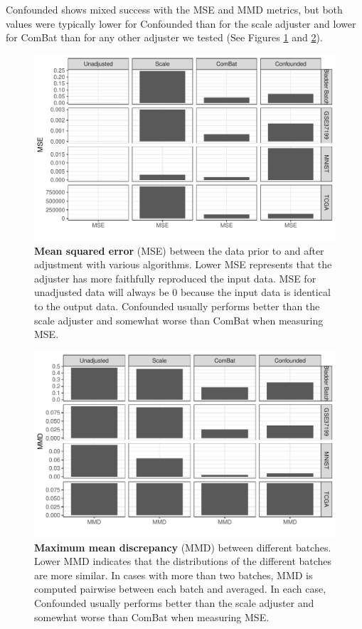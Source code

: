 \documentclass[notitlepage]{article}
\begin{document}
Confounded shows mixed success with the MSE and MMD metrics, but both values were typically lower for Confounded than for the scale adjuster and lower for ComBat than for any other adjuster we tested (See Figures \ref{fig:mse} and \ref{fig:mmd}).

\begin{figure}
	\centering
	\includegraphics[width=\columnwidth]{figures/final/mse}
	\caption{\textbf{Mean squared error} (MSE) between the data prior to and after adjustment with various algorithms.
	Lower MSE represents that the adjuster has more faithfully reproduced the input data.
	MSE for unadjusted data will always be 0 because the input data is identical to the output data.
	Confounded usually performs better than the scale adjuster and somewhat worse than ComBat when measuring MSE.}
	\label{fig:mse}
\end{figure}
\begin{figure}
	\centering
	\includegraphics[width=\columnwidth]{figures/final/mmd}
	\caption{\textbf{Maximum mean discrepancy} (MMD) between different batches. Lower MMD indicates that the distributions of the different batches are more similar.
	In cases with more than two batches, MMD is computed pairwise between each batch and averaged.
	In each case, Confounded usually performs better than the scale adjuster and somewhat worse than ComBat when measuring MSE.}
	\label{fig:mmd}
\end{figure}
\end{document}
